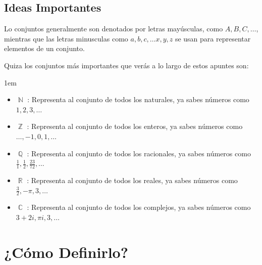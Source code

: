 \documentclass[12pt, fleqn]{report}                             %
\newenvironment{SmallIndentation}[1][0.75em]                    %
        {\begin{adjustwidth}{#1}{}\begin{footnotesize}}             %
        {\end{footnotesize}\end{adjustwidth}}                       %
\theoremstyle{break}                                            %
\DeclareMathOperator \Naturals     {\mathbb{N}}                 %
\DeclareMathOperator \Integers     {\mathbb{Z}}                 %
\DeclareMathOperator \Racionals    {\mathbb{Q}}                 %
\DeclareMathOperator \Reals        {\mathbb{R}}                 %
\DeclareMathOperator \Complexs     {\mathbb{C}}                 %
\begin{document}
            \subsection*{Ideas Importantes}

            Lo conjuntos generalmente son denotados por letras mayúsculas, como $A, B, C, \dots$, mientras
            que las letras minusculas como $a, b, c, \dots x, y, z$ se usan para representar elementos
            de un conjunto.


            Quiza los conjuntos más importantes que verás a lo largo de estos apuntes son:

            \begin{SmallIndentation}[1em]
            \begin{itemize}
                \item $\Naturals$ : Representa al conjunto de todos los naturales, ya sabes
                        números como $1, 2, 3, \dots$
                \item $\Integers$ : Representa al conjunto de todos los enteros, ya sabes
                        números como $\dots, -1, 0, 1, \dots$
                \item $\Racionals$ : Representa al conjunto de todos los racionales, ya sabes
                        números como $\frac{1}{1}, \frac{1}{2}, \frac{23}{72}, \dots$
                \item $\Reals$ : Representa al conjunto de todos los reales, ya sabes
                        números como $\frac{3}{2}, -\pi, 3, \dots$
                \item $\Complexs$ : Representa al conjunto de todos los complejos, ya sabes
                        números como $3 + 2i, \pi i, 3, \dots$
            \end{itemize}
            \end{SmallIndentation}
                




        \clearpage
        \section{¿Cómo Definirlo?}
\end{document}
